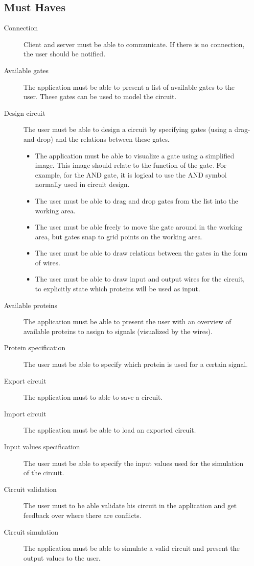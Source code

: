 \documentclass[a4paper]{article}
\begin{document}
\subsection{Must Haves}
\begin{description}
\item[Connection] Client and server must be able to communicate. If there is no connection, the user should be notified.
\item[Available gates] The application must be able to present a list of available gates to the user. These gates can be used to model the circuit.
\item[Design circuit] The user must be able to design a circuit by specifying gates (using a drag-and-drop) and the relations between these gates.
	\begin{itemize}
	\item The application must be able to visualize a gate using a simplified image. This image should relate to the function of the gate. For example, for the AND gate, it is logical to use the AND symbol normally used in circuit design.
	\item The user must be able to drag and drop gates from the list into the working area.
	\item The user must be able freely to move the gate around in the working area, but gates snap to grid points on the working area.
	\item The user must be able to draw relations between the gates in the form of wires.
	\item The user must be able to draw input and output wires for the circuit, to explicitly state which proteins will be used as input.
	\end{itemize}
\item[Available proteins] The application must be able to present the user with an overview of available proteins to assign to signals (visualized by the wires).
\item[Protein specification] The user must be able to specify which protein is used for a certain signal.
\item[Export circuit] The application must to able to save a circuit.
\item[Import circuit] The application must be able to load an exported circuit.
\item[Input values specification] The user must be able to specify the input values used for the simulation of the circuit.
\item[Circuit validation] The user must to be able validate his circuit in the application and get feedback over where there are conflicts.
\item[Circuit simulation] The application must be able to simulate a valid circuit and present the output values to the user.
\end{description}
\end{document}
